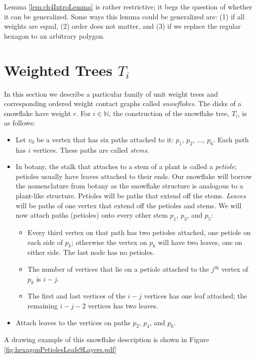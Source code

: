 \documentclass[10pt]{CSUNthesis}
\theoremstyle{plain}%
\theoremstyle{definition}
\theoremstyle{remark}
\newcommand{\jth}{j^\text{th}}
\newcommand{\bbN}{{\mathbb{N}}}
\begin{document}
Lemma \ref{lem:ch4IntroLemma} is rather restrictive; it begs the question of whether it can be generalized. Some ways this lemma could be generalized are: (1) if all weights are equal, (2) order does not matter, and (3) if we replace the regular hexagon to an arbitrary polygon. \section{Weighted Trees $T_i$}
In this section we describe a particular family of unit weight trees and corresponding ordered weight contact graphs called \textit{snowflakes}.  
The disks of a snowflake have weight $r$.  
For $i \in \bbN$, the construction of the snowflake tree, $T_i$, is as follows:
\begin{itemize}
\item Let $v_0$ be a vertex that has six paths attached to it: $p_1$, $p_2$, $\dots$, $p_6$.  
Each path has $i$ vertices. 
These paths are called \textit{stems}.
\item In botany, the stalk that attaches to a stem of a plant is called a \textit{petiole}; petioles usually have leaves attached to their ends.  
Our snowflake will borrow the nomenclature from botany as the snowflake structure is analogous to a plant-like structure.  
Petioles will be paths that extend off the stems.  
\textit{Leaves} will be paths of one vertex that extend off the petioles and stems.  
We will now attach paths (petioles) onto every other stem $p_1$, $p_3$, and $p_5$: 
	\begin{itemize}
		\item 	Every third vertex on that path has two petioles attached, one petiole on each side of $p_k$; otherwise the vertex on $p_k$ will have two leaves, one on either side.  The last node has no petioles.
		\item	The number of vertices that lie on a petiole attached to the $\jth$ vertex of  $p_k$ is $i-j$.
		\item The first and last vertices of the $i-j$ vertices has one leaf attached; the remaining $i-j-2$ vertices has two leaves. %
	\end{itemize}
\item Attach leaves to the vertices on paths $p_2$, $p_4$, and $p_6$.
\end{itemize}
A drawing example of this snowflake description is shown in Figure \ref{fig:hexagonPetiolesLeafs9Layers.pdf}
\end{document}
